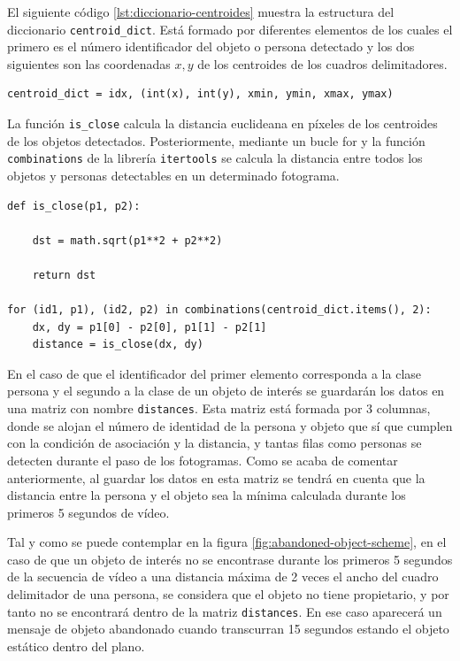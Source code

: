 El siguiente código \ref{lst:diccionario-centroides} muestra la estructura del diccionario \texttt{centroid\_dict}. Está formado por diferentes elementos de los cuales el primero es el número identificador del objeto o persona detectado y los dos siguientes son las coordenadas $x,y$ de los centroides de los cuadros delimitadores.

\vspace{0.5cm}
\begin{lstlisting}[language=iPython,caption=Diccionario centroides personas y objetos,captionpos=b,label={lst:diccionario-centroides}]
centroid_dict = idx, (int(x), int(y), xmin, ymin, xmax, ymax)
\end{lstlisting}

La función \texttt{is\_close} calcula la distancia euclideana en píxeles de los centroides de los objetos detectados. Posteriormente, mediante un bucle for y la función \texttt{combinations} de la librería \texttt{itertools} se calcula la distancia entre todos los objetos y personas detectables en un determinado fotograma.

\vspace{0.5cm}
\begin{lstlisting}[language=iPython,caption=Cálculo distancia entre persona y objetos,captionpos=b,label={lst:calculo-distancia-persona-objeto}]
def is_close(p1, p2):

    dst = math.sqrt(p1**2 + p2**2)
    
    return dst 

for (id1, p1), (id2, p2) in combinations(centroid_dict.items(), 2):
    dx, dy = p1[0] - p2[0], p1[1] - p2[1]
    distance = is_close(dx, dy)
\end{lstlisting}

En el caso de que el identificador del primer elemento corresponda a la clase persona y el segundo a la clase de un objeto de interés se guardarán los datos en una matriz con nombre \texttt{distances}. Esta matriz está formada por 3 columnas, donde se alojan el número de identidad de la persona y objeto que sí que cumplen con la condición de asociación y la distancia, y tantas filas como personas se detecten durante el paso de los fotogramas. Como se acaba de comentar anteriormente, al guardar los datos en esta matriz se tendrá en cuenta que la distancia entre la persona y el objeto sea la mínima calculada durante los primeros 5 segundos de vídeo.

Tal y como se puede contemplar en la figura \ref{fig:abandoned-object-scheme}, en el caso de que un objeto de interés no se encontrase durante los primeros 5 segundos de la secuencia de vídeo a una distancia máxima de 2 veces el ancho del cuadro delimitador de una persona, se considera que el objeto no tiene propietario, y por tanto no se encontrará dentro de la matriz \texttt{distances}. En ese caso aparecerá un mensaje de objeto abandonado cuando transcurran 15 segundos estando el objeto estático dentro del plano.

